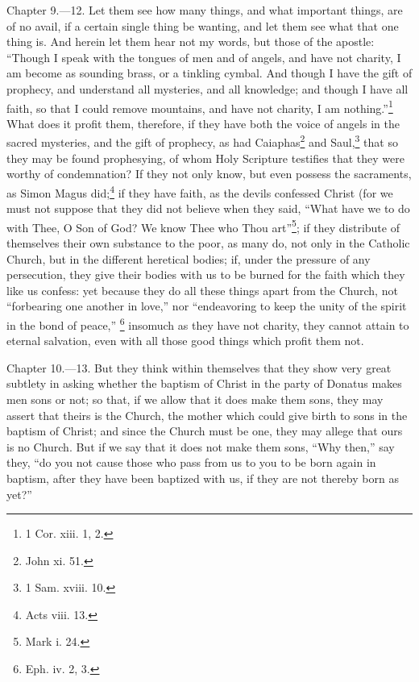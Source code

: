 Chapter 9.—12. Let them see how many things, and what important things, are of no avail, if a certain single thing be wanting, and let them see what that one thing is. And herein let them hear not my words, but those of the apostle: ``Though I speak with the tongues of men and of angels, and have not charity, I am become as sounding brass, or a tinkling cymbal. And though I have the gift of prophecy, and understand all mysteries, and all knowledge; and though I have all faith, so that I could remove mountains, and have not charity, I am nothing.''\footnote{\par  1 Cor. xiii. 1, 2.} What does it profit them, therefore, if they have both the voice of angels in the sacred mysteries, and the gift of prophecy, as had Caiaphas\footnote{\par  John xi. 51.} and Saul,\footnote{\par  1 Sam. xviii. 10.} that so they may be found prophesying, of whom Holy Scripture testifies that they were worthy of condemnation? If they not only know, but even possess the sacraments, as Simon Magus did;\footnote{\par  Acts viii. 13.} if they have faith, as the devils confessed Christ (for we must not suppose that they did not believe when they said, ``What have we to do with Thee, O Son of God? We know Thee who Thou art''\footnote{\par  Mark i. 24.}; if they distribute of themselves their own substance to the poor, as many do, not only in the Catholic Church, but in the different heretical bodies; if, under the pressure of any persecution, they give their bodies with us to be burned for the faith which they like us confess: yet because they do all these things apart from the Church, not ``forbearing one another in love,'' nor ``endeavoring to keep the unity of the spirit in the bond of peace,'' \footnote{\par  Eph. iv. 2, 3.} insomuch as they have not charity, they cannot attain to eternal salvation, even with all those good things which profit them not.


Chapter 10.—13. But they think within themselves that they show very great subtlety in asking whether the baptism of Christ in the party of Donatus makes men sons or not; so that, if we allow that it does make them sons, they may assert that theirs is the Church, the mother which could give birth to sons in the baptism of Christ; and since the Church must be one, they may allege that ours is no Church. But if we say that it does not make them sons, ``Why then,'' say they, ``do you not cause those who pass from us to you to be born again in baptism, after they have been baptized with us, if they are not thereby born as yet?''


